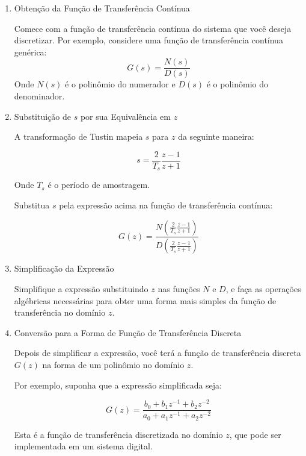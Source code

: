 \documentclass[a4paper,12pt]{article}
\begin{document}
\begin{enumerate}
    \item Obtenção da Função de Transferência Contínua

    Comece com a função de transferência contínua do sistema que você deseja discretizar. Por exemplo, considere uma função de transferência contínua genérica:
    \begin{equation*}
        G(s) = \frac{N(s)}{D(s)}\tag{2.5.1.1}
    \end{equation*}
    Onde \(N(s)\) é o polinômio do numerador e \(D(s)\) é o polinômio do denominador.

    \item Substituição de \(s\) por sua Equivalência em \(z\)

    A transformação de Tustin mapeia \(s\) para \(z\) da seguinte maneira:

    \begin{equation}
        s = \frac{2}{T_s} \frac{z - 1}{z + 1}\tag{2.5.1.2}
    \end{equation}
    
    Onde \(T_s\) é o período de amostragem.
    
    Substitua \(s\) pela expressão acima na função de transferência contínua:
    
    \begin{equation*}
            G(z) = \frac{N\left(\frac{2}{T_s} \frac{z - 1}{z + 1}\right)}{D\left(\frac{2}{T_s} \frac{z - 1}{z + 1}\right)}\tag{2.5.1.3}
    \end{equation*}

    \item  Simplificação da Expressão

    Simplifique a expressão substituindo \(z\) nas funções \(N\) e \(D\), e faça as operações algébricas necessárias para obter uma forma mais simples da função de transferência no domínio \(z\).

    \item Conversão para a Forma de Função de Transferência Discreta

    Depois de simplificar a expressão, você terá a função de transferência discreta \(G(z)\) na forma de um polinômio no domínio \(z\).

    Por exemplo, suponha que a expressão simplificada seja:
    
    \begin{equation}
        G(z) = \frac{b_0 + b_1z^{-1} + b_2z^{-2}}{a_0 + a_1z^{-1} + a_2z^{-2}}\tag{2.5.1.4}
    \end{equation}
    
    Esta é a função de transferência discretizada no domínio \(z\), que pode ser implementada em um sistema digital.
\end{enumerate}
\end{document}

